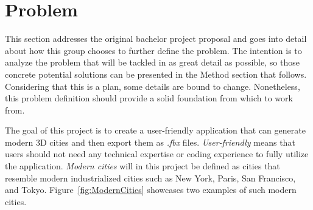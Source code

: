 \section{Problem}
\label{sec:problem}

This section addresses the original bachelor project proposal and goes into detail about how this group chooses to further define the problem.
The intention is to analyze the problem that will be tackled in as great detail as possible, so those concrete potential solutions can be presented in the Method section that follows.
Considering that this is a plan, some details are bound to change.
Nonetheless, this problem definition should provide a solid foundation from which to work from.

The goal of this project is to create a user-friendly application that can generate modern 3D cities and then export them as \textit{.fbx} files.
\textit{User-friendly} means that users should not need any technical expertise or coding experience to fully utilize the application.
\textit{Modern cities} will in this project be defined as cities that resemble modern industrialized cities such as New York, Paris, San Francisco, and Tokyo.
Figure~\ref{fig:ModernCities} showcases two examples of such modern cities.


